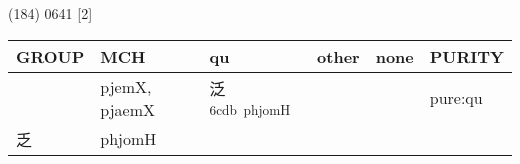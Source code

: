 \documentclass[14pt,a4paper]{scrartcl}
\begin{document}
(184) 0641 {[}2{]}

\begin{longtable}[c]{@{}llllll@{}}
\toprule
\begin{minipage}[b]{0.14\columnwidth}\raggedright\strut
GROUP
\strut\end{minipage} &
\begin{minipage}[b]{0.14\columnwidth}\raggedright\strut
MCH
\strut\end{minipage} &
\begin{minipage}[b]{0.14\columnwidth}\raggedright\strut
qu
\strut\end{minipage} &
\begin{minipage}[b]{0.14\columnwidth}\raggedright\strut
other
\strut\end{minipage} &
\begin{minipage}[b]{0.14\columnwidth}\raggedright\strut
none
\strut\end{minipage} &
\begin{minipage}[b]{0.14\columnwidth}\raggedright\strut
PURITY
\strut\end{minipage}\tabularnewline
\midrule
\endhead
\begin{minipage}[t]{0.14\columnwidth}\raggedright\strut
𢎘
\strut\end{minipage} &
\begin{minipage}[t]{0.14\columnwidth}\raggedright\strut
pjemX, pjaemX
\strut\end{minipage} &
\begin{minipage}[t]{0.14\columnwidth}\raggedright\strut
泛\textsuperscript{6cdb~phjomH}
\strut\end{minipage} &
\begin{minipage}[t]{0.14\columnwidth}\raggedright\strut
\strut\end{minipage} &
\begin{minipage}[t]{0.14\columnwidth}\raggedright\strut
\strut\end{minipage} &
\begin{minipage}[t]{0.14\columnwidth}\raggedright\strut
pure:qu
\strut\end{minipage}\tabularnewline
\begin{minipage}[t]{0.14\columnwidth}\raggedright\strut
乏
\strut\end{minipage} &
\begin{minipage}[t]{0.14\columnwidth}\raggedright\strut
phjomH
\strut\end{minipage} &
\begin{minipage}[t]{0.14\columnwidth}\raggedright\strut

\end{minipage}
\end{longtable}
\end{document}
